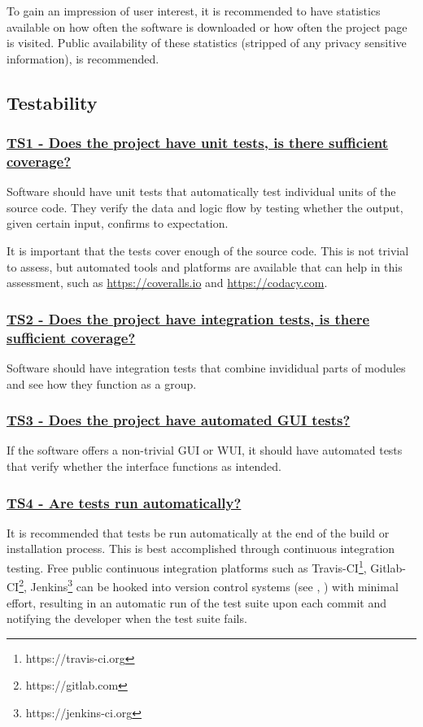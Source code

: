 \documentclass[a4paper,11pt]{article}
\newcommand{\criterion}[2]{\subsubsection*{\underline{#1 - #2}}\label{id:#1}}
\newcommand\CheckTable{%
  \begin{tabular}{ccccc}
    No & Minimal & Adequate & Good & Perfect \\
    0 & 1 & 2 & 3 & 4 \\
    \hline
    $\square$ & $\square$ & $\square$ & $\square$ & $\square$ \\
  \end{tabular}%
}
\newcommand{\refcrit}[1]{%
 \framebox[1.1\width]{\hyperref[id:#1]{#1}}
}
\begin{document}
To gain an impression of user interest, it is recommended to have statistics
available on how often the software is downloaded or how often the project page
is visited. Public availability of these statistics (stripped of any privacy
sensitive information), is recommended.


\subsection{Testability}\label{sec:tes}

\newcommand{\tsOneID}{TS1}
\newcommand{\tsOneText}{Does the project have unit tests, is there sufficient coverage?}
\criterion{\tsOneID}{\tsOneText}

Software should have unit tests that automatically test individual units of the
source code. They verify the data and logic flow by testing whether the output,
given certain input, confirms to expectation.

It is important that the tests cover enough of the source code. This is not
trivial to assess, but automated tools
and platforms are available that can help in this assessment, such as
\url{https://coveralls.io} and \url{https://codacy.com}.


\newcommand{\tsTwoID}{TS2}
\newcommand{\tsTwoText}{Does the project have integration tests, is there sufficient coverage?}
\criterion{\tsTwoID}{\tsTwoText}

Software should have integration tests that combine invididual parts of modules and see how they function
as a group.


\newcommand{\tsThreeID}{TS3}
\newcommand{\tsThreeText}{Does the project have automated GUI tests?}
\criterion{\tsThreeID}{\tsThreeText}

If the software offers a non-trivial GUI or WUI, it should have automated tests
that verify whether the interface functions as intended.


\newcommand{\tsFourID}{TS4}
\newcommand{\tsFourText}{Are tests run automatically?}
\criterion{\tsFourID}{\tsFourText}

It is recommended that tests be run automatically at the end of the build
or installation process. This is best accomplished through continuous
integration testing. Free public continuous integration
platforms such as Travis-CI\footnote{https://travis-ci.org},
Gitlab-CI\footnote{https://gitlab.com},
Jenkins\footnote{https://jenkins-ci.org} can be hooked into version control
systems (see \refcrit{AC1}, \refcrit{AC2}) with minimal effort, resulting in an
automatic run of the test suite upon each commit and notifying the developer
when the test suite fails.
\end{document}

